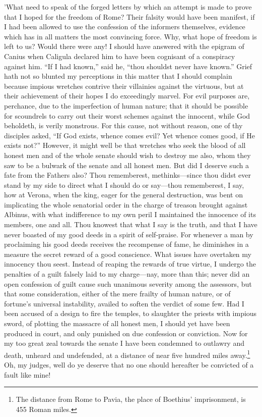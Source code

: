 'What need to speak of the forged letters by which an attempt is made to
prove that I hoped for the freedom of Rome? Their falsity would have
been manifest, if I had been allowed to use the confession of the
informers themselves, evidence which has in all matters the most
convincing force. Why, what hope of freedom is left to us? Would there
were any! I should have answered with the epigram of Canius when
Caligula declared him to have been cognisant of a conspiracy against
him. ``If I had known,'' said he, ``thou shouldst never have known.'' Grief
hath not so blunted my perceptions in this matter that I should complain
because impious wretches contrive their villainies against the virtuous,
but at their achievement of their hopes I do exceedingly marvel. For
evil purposes are, perchance, due to the imperfection of human nature;
that it should be possible for scoundrels to carry out their worst
schemes against the innocent, while God beholdeth, is verily monstrous.
For this cause, not without reason, one of thy disciples asked, ``If God
exists, whence comes evil? Yet whence comes good, if He exists not?''
However, it might well be that wretches who seek the blood of all honest
men and of the whole senate should wish to destroy me also, whom they
saw to be a bulwark of the senate and all honest men. But did I deserve
such a fate from the Fathers also? Thou rememberest, methinks—since
thou didst ever stand by my side to direct what I should do or say—thou
rememberest, I say, how at Verona, when the king, eager for the general
destruction, was bent on implicating the whole senatorial order in the
charge of treason brought against Albinus, with what indifference to my
own peril I maintained the innocence of its members, one and all. Thou
knowest that what I say is the truth, and that I have never boasted of
my good deeds in a spirit of self-praise. For whenever a man by
proclaiming his good deeds receives the recompense of fame, he
diminishes in a measure the secret reward of a good conscience. What
issues have overtaken my innocency thou seest. Instead of reaping the
rewards of true virtue, I undergo the penalties of a guilt falsely laid
to my charge—nay, more than this; never did an open confession of guilt
cause such unanimous severity among the assessors, but that some
consideration, either of the mere frailty of human nature, or of
fortune's universal instability, availed to soften the verdict of some
few. Had I been accused of a design to fire the temples, to slaughter
the priests with impious sword, of plotting the massacre of all honest
men, I should yet have been produced in court, and only punished on due
confession or conviction. Now for my too great zeal towards the senate I
have been condemned to outlawry and death, unheard and undefended, at a
distance of near five hundred miles away.\footnote{The distance from Rome to Pavia, the place of Boethius'
imprisonment, is 455 Roman miles.} Oh, my judges, well do ye
deserve that no one should hereafter be convicted of a fault like mine!

